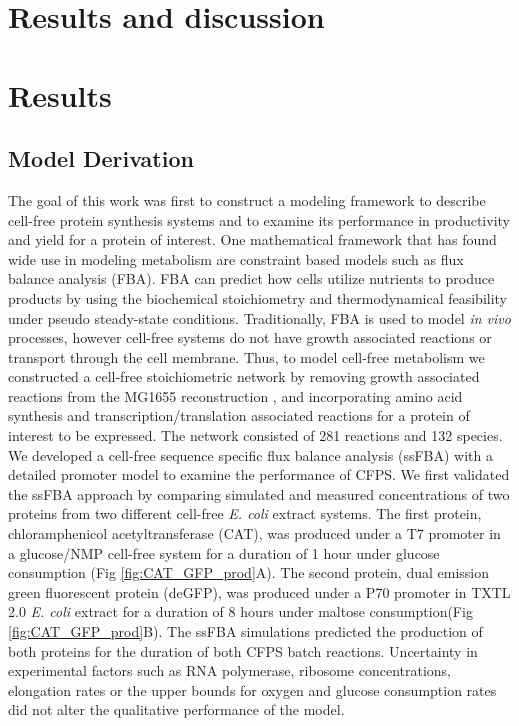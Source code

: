 \documentclass[journal=asbcd6,manuscript=article]{achemso}
\begin{document}
\section{Results and discussion}


\section*{Results}
\subsection{Model Derivation}
The goal of this work was first to construct a modeling framework to describe cell-free protein synthesis systems and to examine its performance in productivity and yield for a protein of interest.
One mathematical framework that has found wide use in modeling metabolism are constraint based models such as flux balance analysis (FBA).
FBA can predict how cells utilize nutrients to produce products by using the biochemical stoichiometry and thermodynamical feasibility under pseudo steady-state conditions.
Traditionally, FBA is used to model \textit{in vivo} processes, however cell-free systems do not have growth associated reactions or transport through the cell membrane.
Thus, to model cell-free metabolism we constructed a cell-free stoichiometric network by removing growth associated reactions from the MG1655 reconstruction \cite{Feist:2007aa}, and incorporating amino acid synthesis and transcription/translation associated reactions \cite{Allen:2003aa} for a protein of interest to be expressed. 
The network consisted of 281 reactions and 132 species. 
We developed a cell-free sequence specific flux balance analysis (ssFBA) with a detailed promoter model \cite{Moon:2012aa} to examine the performance of CFPS. 
We first validated the ssFBA approach by comparing simulated and measured concentrations of two proteins from two different cell-free \textit{E. coli} extract systems.
The first protein, chloramphenicol acetyltransferase (CAT), was produced under a T7 promoter in a glucose/NMP cell-free system \cite{2005_calhoun_BiotechnologyProgress} for a duration of 1 hour under glucose consumption (Fig \ref{fig:CAT_GFP_prod}A).
The second protein, dual emission green fluorescent protein (deGFP), was produced under a P70 promoter in TXTL 2.0 \textit{E. coli} extract for a duration of 8 hours under maltose consumption(Fig \ref{fig:CAT_GFP_prod}B).
The ssFBA simulations predicted the production of both proteins for the duration of both CFPS batch reactions.
Uncertainty in experimental factors such as RNA polymerase, ribosome concentrations, elongation rates or the upper bounds for oxygen and glucose consumption rates did not alter the qualitative performance of the model. 
\end{document}
